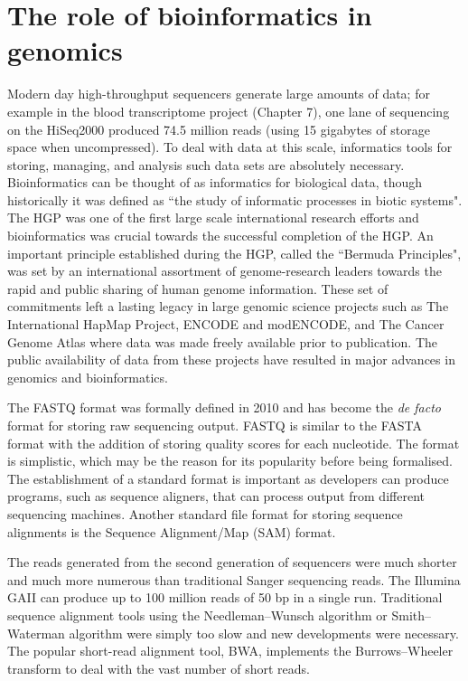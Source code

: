 \section{The role of bioinformatics in genomics}

Modern day high-throughput sequencers generate large amounts of data; for example in the blood transcriptome project (Chapter 7), one lane of sequencing on the HiSeq2000 produced 74.5 million reads (using 15 gigabytes of storage space when uncompressed). To deal with data at this scale, informatics tools for storing, managing, and analysis such data sets are absolutely necessary. Bioinformatics can be thought of as informatics for biological data, though historically it was defined as ``the study of informatic processes in biotic systems"\cite{pmid21483479}. The HGP was one of the first large scale international research efforts and bioinformatics was crucial towards the successful completion of the HGP\cite{stein1996perl}. An important principle established during the HGP, called the ``Bermuda Principles", was set by an international assortment of genome-research leaders towards the rapid and public sharing of human genome information. These set of commitments left a lasting legacy in large genomic science projects such as The International HapMap Project, ENCODE and modENCODE, and The Cancer Genome Atlas where data was made freely available prior to publication\cite{contreras2011bermuda}. The public availability of data from these projects have resulted in major advances in genomics and bioinformatics.

The FASTQ format was formally defined in 2010\cite{pmid20015970} and has become the \textit{de facto} format for storing raw sequencing output. FASTQ is similar to the FASTA format with the addition of storing quality scores for each nucleotide. The format is simplistic, which may be the reason for its popularity before being formalised. The establishment of a standard format is important as developers can produce programs, such as sequence aligners, that can process output from different sequencing machines. Another standard file format for storing sequence alignments is the Sequence Alignment/Map (SAM) format\cite{pmid19505943}.

The reads generated from the second generation of sequencers were much shorter and much more numerous than traditional Sanger sequencing reads. The Illumina GAII can produce up to 100 million reads of 50 bp in a single run. Traditional sequence alignment tools using the Needleman–Wunsch algorithm or Smith–Waterman algorithm were simply too slow and new developments were necessary. The popular short-read alignment tool, BWA\cite{pmid19451168}, implements the Burrows–Wheeler transform to deal with the vast number of short reads.

